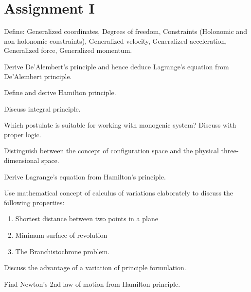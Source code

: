 \documentclass[12pt]{article}
\begin{document}
\section{Assignment I}
\begin{prob}
    Define: Generalized coordinates, Degrees of freedom, Constraints (Holonomic and non-holonomic constraints), Generalized velocity, Generalized acceleration, Generalized force, Generalized momentum.
\end{prob}
\begin{prob}
    Derive De'Alembert's principle and hence deduce Lagrange's equation from De'Alembert principle.
\end{prob}
\begin{prob}
    Define and derive Hamilton principle.
\end{prob}
\begin{prob}
    Discuss integral principle.
\end{prob}
\begin{prob}
    Which postulate is suitable for working with monogenic system? Discuss with proper logic.
\end{prob}
\begin{prob}
    Distinguish between the concept of configuration space and the physical three-dimensional space.
\end{prob}
\begin{prob}
    Derive Lagrange's equation from Hamilton's principle.
\end{prob}
\begin{prob}
    Use mathematical concept of calculus of variations elaborately to discuss the following properties:
    \begin{enumerate}[label=(\roman*)]
        \item Shortest distance between two points in a plane
        \item Minimum surface of revolution
        \item The Branchistochrone problem.
    \end{enumerate}
\end{prob}
\begin{prob}
    Discuss the advantage of a variation of principle formulation.
\end{prob}
\begin{prob}
    Find Newton's 2nd law of motion from Hamilton principle.
\end{prob}
\end{document}
